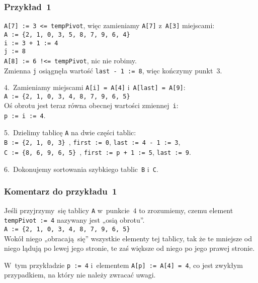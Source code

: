 \documentclass[10pt,t]{beamer}
\begin{document}
\begin{frame}
  \frametitle{Przykład~1}


  \texttt{A[7] := 3 <= tempPivot}, więc zamieniamy \texttt{A[7]}
  z~\texttt{A[3]} miejscami: \\
  \texttt{A := \{2, 1, 0, 3, 5, 8, 7, 9, 6, 4\} } \\
  \texttt{i := 3 + 1 := 4} \\
  \texttt{j := 8} \\
  \texttt{A[8] := 6 !<= tempPivot}, nic nie robimy. \\
  Zmienna \texttt{j} osiągnęła wartość \texttt{last - 1 := 8}, więc
  kończymy punkt~$3$.

  4.~Zamieniamy miejscami \texttt{A[i] = A[4]} i~\texttt{A[last] = A[9]}: \\
  \texttt{A := \{2, 1, 0, 3, 4, 8, 7, 9, 6, 5\} } \\
  Oś obrotu jest teraz równa obecnej wartości zmiennej~\texttt{i}: \\
  \texttt{p := i := 4}.

  5.~Dzielimy tablicę \texttt{A} na dwie części tablic: \\
  \texttt{B := \{2, 1, 0, 3\} }, \texttt{first := 0},
  \texttt{last := 4 - 1 := 3}, \\
  \texttt{C := \{8, 6, 9, 6, 5\} }, \texttt{first := p + 1 := 5},
  \texttt{last := 9}.

  6.~Dokonujemy sortowania szybkiego tablic~\texttt{B} i~\texttt{C}.

\end{frame}





\begin{frame}
  \frametitle{Komentarz do przykładu~1}


  Jeśli przyjrzymy~się tablicy \texttt{A} w~punkcie~$4$ to zrozumiemy, czemu
  element \texttt{tempPivot := 4} nazywany jest „osią obrotu”. \\
  \texttt{A := \{2, 1, 0, 3, 4, 8, 7, 9, 6, 5\} } \\
  Wokół niego „obracają~się” wszystkie elementy tej tablicy, tak że te
  mniejsze od niego lądują po lewej jego stronie, te zaś większe od niego
  po jego prawej stronie.

  W~tym przykładzie \texttt{p := 4} i~elementem \texttt{A[p] := A[4] = 4},
  co jest zwykłym przypadkiem, na który nie należy zwracać uwagi.

\end{frame}
\end{document}
